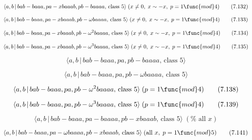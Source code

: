 \documentclass[10pt]{article}
\begin{document}
\begin{equation}
\langle a,b\,|\,bab-baaa,pa-xbaaab,pb-baaaa,\,\text{class }5\rangle \;(x\neq
0,\;x\sim -x,\;p=1\func{mod}4)  \tag{7.132}
\end{equation}

\begin{equation}
\langle a,b\,|\,bab-baaa,pa-xbaaab,pb-\omega baaaa,\,\text{class }5\rangle
\;(x\neq 0,\;x\sim -x,\;p=1\func{mod}4)  \tag{7.133}
\end{equation}

\begin{equation}
\langle a,b\,|\,bab-baaa,pa-xbaaab,pb-\omega ^{2}baaaa,\,\text{class }%
5\rangle \;(x\neq 0,\;x\sim -x,\;p=1\func{mod}4)  \tag{7.134}
\end{equation}

\begin{equation}
\langle a,b\,|\,bab-baaa,pa-xbaaab,pb-\omega ^{3}baaaa,\,\text{class }%
5\rangle \;(x\neq 0,\;x\sim -x,\;p=1\func{mod}4)  \tag{7.135}
\end{equation}

\begin{equation}
\langle a,b\,|\,bab-baaa,pa,pb-baaaa,\,\text{class }5\rangle  \tag{7.136}
\end{equation}

\begin{equation}
\langle a,b\,|\,bab-baaa,pa,pb-\omega baaaa,\,\text{class }5\rangle 
\tag{7.137}
\end{equation}

\begin{equation}
\langle a,b\,|\,bab-baaa,pa,pb-\omega ^{2}baaaa,\,\text{class }5\rangle
\;(p=1\func{mod}4)  \tag{7.138}
\end{equation}

\begin{equation}
\langle a,b\,|\,bab-baaa,pa,pb-\omega ^{3}baaaa,\,\text{class }5\rangle
\;(p=1\func{mod}4)  \tag{7.139}
\end{equation}

\begin{equation}
\langle a,b\,|\,bab-baaa,pa-baaaa,pb-xbaaab,\,\text{class }5\rangle \;(\text{%
all }x)  \tag{7.140}
\end{equation}

\begin{equation}
\langle a,b\,|\,bab-baaa,pa-\omega baaaa,pb-xbaaab,\,\text{class }5\rangle
\;(\text{all }x,\;p=1\func{mod}5)  \tag{7.141}
\end{equation}
\end{document}
